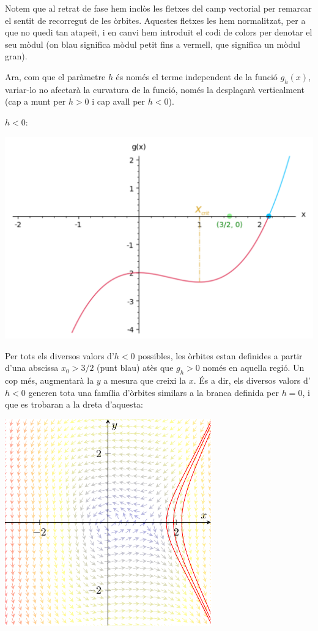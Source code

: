 \documentclass[10pt,a4paper]{article}
\begin{document}
Notem que al retrat de fase hem inclòs les fletxes del camp vectorial per remarcar el sentit de recorregut de les òrbites. Aquestes fletxes les hem normalitzat, per a que no quedi tan atapeït, i en canvi hem introduït el codi de colors per denotar el seu mòdul (on blau significa mòdul petit fins a vermell, que significa un mòdul gran).

Ara, com que el paràmetre $h$ és només el terme independent de la funció $g_h(x)$, variar-lo no afectarà la curvatura de la funció, només la desplaçarà verticalment (cap a munt per $h>0$ i cap avall per $h<0$).

\pagebreak
\underline{$h<0$}:
\begin{center}
  \begin{minipage}[h]{\textwidth}
    \centering
    \includegraphics[scale=0.5]{Images/gh=-1}
    \label{gh=-1}
  \end{minipage}
\end{center}
Per tots els diversos valors d'$h<0$ possibles, les òrbites estan definides a partir d'una abscissa $x_0>3/2$ (punt blau) atès que $g_h>0$ només en aquella regió. Un cop més, augmentarà la $y$ a mesura que creixi la $x$. És a dir, els diversos valors d'$h<0$ generen tota una família d'òrbites similars a la branca definida per $h=0$, i que es trobaran a la dreta d'aquesta:
\begin{center}
  \begin{minipage}[h]{\textwidth}
    \centering
    \includegraphics[scale=1.5]{Images/retrat2h-1}
    \label{retrat-1}
  \end{minipage}
\end{center}
\end{document}

